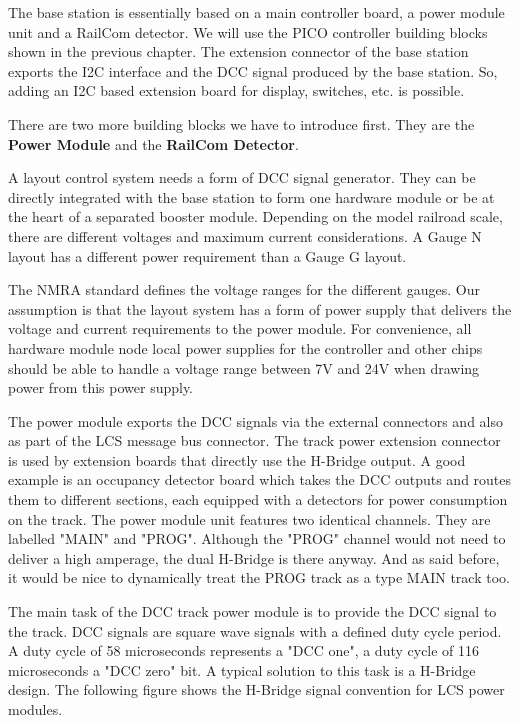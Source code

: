 
The base station is essentially based on a main controller board, a power module unit and a RailCom detector. We will use the PICO controller building blocks shown in the previous chapter. The extension connector of the base station exports the I2C interface and the DCC signal produced by the base station. So, adding an I2C based extension board for display, switches, etc. is possible. 

There are two more building blocks we have to introduce first. They are the \textbf{Power Module} and the \textbf{RailCom Detector}.


A layout control system needs a form of DCC signal generator. They can be directly integrated with the base station to form one hardware module or be at the heart of a separated booster module. Depending on the model railroad scale, there are different voltages and maximum current considerations. A Gauge N layout has a different power requirement than a Gauge G layout. 

The NMRA standard defines the voltage ranges for the different gauges. Our assumption is that the layout system has a form of power supply that delivers the voltage and current requirements to the power module. For convenience, all hardware module node local power supplies for the controller and other chips should be able to handle a voltage range between 7V and 24V when drawing power from this power supply.

The power module exports the DCC signals via the external connectors and also as part of the LCS message bus connector. The track power extension connector is used by extension boards that directly use the H-Bridge output. A good example is an occupancy detector board which takes the DCC outputs and routes them to different sections, each equipped with a detectors for power consumption on the track. The power module unit features two identical channels. They are labelled "MAIN" and "PROG". Although the "PROG" channel would not need to deliver a high amperage, the dual H-Bridge is there anyway. And as said before, it would be nice to dynamically treat the PROG track as a type MAIN track too. 

 The main task of the DCC track power module is to provide the DCC signal to the track. DCC signals are square wave signals with a defined duty cycle period. A duty cycle of 58 microseconds represents a "DCC one", a duty cycle of 116 microseconds a "DCC zero" bit. A typical solution to this task is a H-Bridge design. The following figure shows the H-Bridge signal convention for LCS power modules.
 
